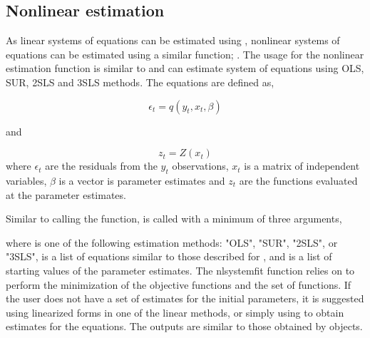 


\subsection{Nonlinear estimation}

As linear systems of equations can be estimated using
, nonlinear systems of equations \citep{hausman75}
can be estimated using a similar function; .
The usage for the nonlinear estimation function is similar to
 and can estimate system of equations using OLS, SUR,
2SLS and 3SLS methods.
The equations are defined as,

\begin{equation}
  \label{eq:non_linear_eq_1}
  \epsilon_{t} = q( y_t, x_t, \beta )
\end{equation}
 
\noindent and

\begin{equation}
  \label{eq:non_linear_eq_2}
  z_{t} = Z( x_t )
\end{equation}
where $\epsilon_{t}$ are the residuals from the $y_t$ observations,
$x_t$ is a matrix of independent variables, $\beta$ is a vector is
parameter estimates and $z_{t}$ are the functions evaluated at the
parameter estimates.

Similar to calling the  function, 
is called with a minimum of three arguments,


where  is one of the following estimation methods: "OLS",
"SUR", "2SLS", or "3SLS",  is a list of equations similar
to those described for , and  is a list of
starting values of the parameter estimates.
The nlsystemfit function relies on  to perform the minimization
of the objective functions and the  set of functions.
If the user does not have a set of estimates for the initial parameters,
it is suggested using linearized forms in one of the linear methods,
or simply using  to obtain estimates for the equations.
The outputs are similar to those obtained by  objects.


